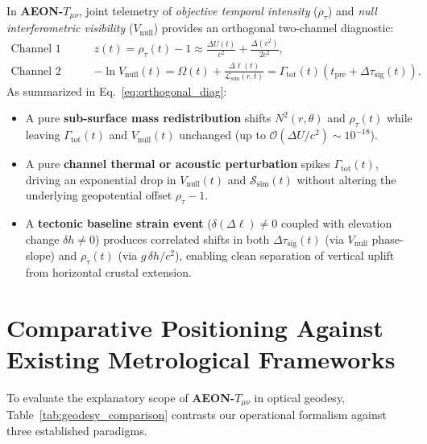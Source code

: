 \documentclass[11pt,a4paper]{article}
\begin{document}
In \textbf{AEON-$T_{\mu\nu}$}, joint telemetry of \emph{objective temporal intensity} ($\rho_\tau$) and \emph{null interferometric visibility} ($V_{\mathrm{null}}$) provides an orthogonal two-channel diagnostic:
\begin{equation}
\begin{aligned}
\text{Channel 1 (Curvature / Potential):}\quad & z(t) = \rho_\tau(t) - 1 \approx \frac{\Delta U(t)}{c^2} + \frac{\Delta(v^2)}{2c^2}, \\
\text{Channel 2 (Horizon / Dissipation):}\quad & -\ln V_{\mathrm{null}}(t) = \Omega(t) + \frac{\Delta\ell(t)}{\mathcal{L}_{\mathrm{sim}}(r,t)} = \Gamma_{\mathrm{tot}}(t)\left(t_{\mathrm{pre}} + \Delta\tau_{\mathrm{sig}}(t)\right).
\end{aligned}
\label{eq:orthogonal_diag}
\end{equation}
As summarized in Eq.~\eqref{eq:orthogonal_diag}:
\begin{itemize}[leftmargin=1.6em]
    \item A pure \textbf{sub-surface mass redistribution} shifts $N^2(r,\theta)$ and $\rho_\tau(t)$ while leaving $\Gamma_{\mathrm{tot}}(t)$ and $V_{\mathrm{null}}(t)$ unchanged (up to $\mathcal{O}(\Delta U/c^2) \sim 10^{-18}$).
    \item A pure \textbf{channel thermal or acoustic perturbation} spikes $\Gamma_{\mathrm{tot}}(t)$, driving an exponential drop in $V_{\mathrm{null}}(t)$ and $\mathcal{S}_{\mathrm{sim}}(t)$ without altering the underlying geopotential offset $\rho_\tau - 1$.
    \item A \textbf{tectonic baseline strain event} ($\delta(\Delta\ell) \neq 0$ coupled with elevation change $\delta h \neq 0$) produces correlated shifts in both $\Delta\tau_{\mathrm{sig}}(t)$ (via $V_{\mathrm{null}}$ phase-slope) and $\rho_\tau(t)$ (via $g\,\delta h / c^2$), enabling clean separation of vertical uplift from horizontal crustal extension.
\end{itemize}

\section{Comparative Positioning Against Existing Metrological Frameworks}

To evaluate the explanatory scope of \textbf{AEON-$T_{\mu\nu}$} in optical geodesy, Table~\ref{tab:geodesy_comparison} contrasts our operational formalism against three established paradigms.
\end{document}
